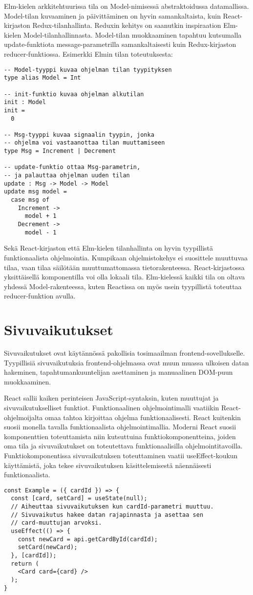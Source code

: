 Elm-kielen arkkitehtuurissa tila on Model-nimisessä abstraktoidussa datamallissa. Model-tilan kuvaaminen ja
päivittäminen on hyvin samankaltaista, kuin React-kirjaston Redux-tilanhallinta. Reduxin kehitys on saanutkin
inspiraation Elm-kielen Model-tilanhallinnasta. Model-tilan muokkaaminen tapahtuu kutsumalla update-funktiota
message-parametrilla samankaltaisesti kuin Redux-kirjaston reducer-funk\-tiossa. \cite{elmlang} Esimerkki Elmin tilan
toteutuksesta:
\begin{verbatim}
-- Model-tyyppi kuvaa ohjelman tilan tyypityksen
type alias Model = Int

-- init-funktio kuvaa ohjelman alkutilan
init : Model
init =
  0

-- Msg-tyyppi kuvaa signaalin tyypin, jonka
-- ohjelma voi vastaanottaa tilan muuttamiseen
type Msg = Increment | Decrement

-- update-funktio ottaa Msg-parametrin,
-- ja palauttaa ohjelman uuden tilan
update : Msg -> Model -> Model
update msg model =
  case msg of
    Increment ->
      model + 1
    Decrement ->
      model - 1
\end{verbatim}

Sekä React-kirjaston että Elm-kielen tilanhallinta on hyvin tyypillistä funktionaalista ohjelmointia. Kumpikaan
ohjelmistokehys ei suosittele muuttuvaa tilaa, vaan tilaa säilötään muuttumattomassa tietorakenteessa. React-kirjastossa
yksittäisellä komponentilla voi olla lokaali tila. Elm-kielessä kaikki tila on oltava yhdessä Model-rakenteessa, kuten
Reactissa on myös usein tyypillistä toteuttaa reducer-funktion avulla.

\section{Sivuvaikutukset}
Sivuvaikutukset ovat käytännössä pakollisia tosimaailman frontend-sovellukselle. Tyypillisiä sivuvaikutuksia
frontend-ohjelmassa ovat muun muassa ulkoisen datan hakeminen, tapahtumankuuntelijan asettaminen ja manuaalinen DOM-puun
muokkaaminen.

React sallii kaiken perinteisen JavaScript-syntaksin, kuten muuttujat ja sivuvaikutukselliset funktiot. Funktionaalinen
ohjelmointimalli vaatiikin React-ohjelmoijal\-ta omaa tahtoa kirjoittaa ohjelma funktionaalisesti. React kuitenkin
suosii monella tavalla funktionaalista ohjelmointimallia. Moderni React suosii komponenttien toteuttamista niin
kutsuttuina funktiokomponentteina, joiden oma tila ja sivuvaikutukset on toteutettava funktionaalisilla
ohjelmointitavoilla. Funktiokomponentissa sivuvaikutuksen toteuttaminen vaatii useEffect-koukun käyttämistä, joka tekee
sivuvaikutuksen käsittelemisestä näennäisesti funktionaalista. \cite{reactjs}
\begin{verbatim}
const Example = ({ cardId }) => {
  const [card, setCard] = useState(null);
  // Aiheuttaa sivuvaikutuksen kun cardId-parametri muuttuu.
  // Sivuvaikutus hakee datan rajapinnasta ja asettaa sen
  // card-muuttujan arvoksi.
  useEffect(() => {
    const newCard = api.getCardById(cardId);
    setCard(newCard);
  }, [cardId]);
  return (
    <Card card={card} />
  );
}
\end{verbatim}

